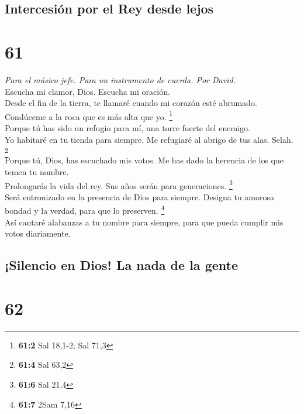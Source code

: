 \hypertarget{intercesiuxf3n-por-el-rey-desde-lejos}{%
\subsection{Intercesión por el Rey desde
lejos}\label{intercesiuxf3n-por-el-rey-desde-lejos}}

\hypertarget{section-59}{%
\section{61}\label{section-59}}

\emph{Para el músico jefe. Para un instrumento de cuerda. Por David.}\\
 Escucha mi clamor, Dios. Escucha mi oración.\\
 Desde el fin de la tierra, te llamaré cuando mi corazón
esté abrumado. Condúceme a la roca que es más alta que yo. \footnote{\textbf{61:2}
  Sal 18,1-2; Sal 71,3}\\
 Porque tú has sido un refugio para mí, una torre fuerte
del enemigo.\\
 Yo habitaré en tu tienda para siempre. Me refugiaré al
abrigo de tus alas. Selah. \footnote{\textbf{61:4} Sal 63,2}\\
 Porque tú, Dios, has escuchado mis votos. Me has dado la
herencia de los que temen tu nombre.\\
 Prolongarás la vida del rey. Sus años serán para
generaciones. \footnote{\textbf{61:6} Sal 21,4}\\
 Será entronizado en la presencia de Dios para siempre.
Designa tu amorosa bondad y la verdad, para que lo preserven.
\footnote{\textbf{61:7} 2Sam 7,16}\\
 Así cantaré alabanzas a tu nombre para siempre, para que
pueda cumplir mis votos diariamente.

\hypertarget{silencio-en-dios-la-nada-de-la-gente}{%
\subsection{¡Silencio en Dios! La nada de la
gente}\label{silencio-en-dios-la-nada-de-la-gente}}

\hypertarget{section-60}{%
\section{62}\label{section-60}}

